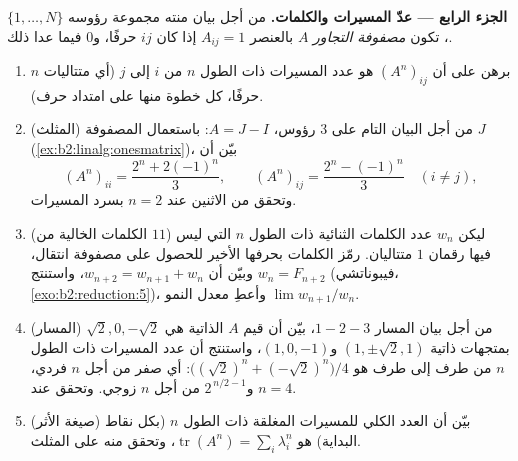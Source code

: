 \begin{problem}
\medskip
\noindent\textbf{الجزء الرابع --- عدّ المسيرات والكلمات.} من أجل
بيان منته مجموعة رؤوسه $\{1, \dots, N\}$، تكون
\emph{مصفوفة التجاور} $A$ بالعنصر $A_{ij} = 1$ إذا كان $ij$ حرفًا،
و$0$ فيما عدا ذلك.
\begin{enumerate}[resume]
  \item برهن على أن $(A^n)_{ij}$ هو عدد المسيرات ذات الطول
        $n$ من $i$ إلى $j$ (أي متتاليات $n$ حرفًا، كل خطوة منها
        على امتداد حرف).
  \item (المثلث) من أجل البيان التام على $3$ رؤوس،
        $A = J - I$: باستعمال  المصفوفة $J$
        (\cref{ex:b2:linalg:onesmatrix})، بيّن أن
        \[
        (A^n)_{ii} = \frac{2^n + 2(-1)^n}{3},
        \qquad
        (A^n)_{ij} = \frac{2^n - (-1)^n}{3} \quad (i \neq j),
        \]
        وتحقق من الاثنين عند $n = 2$ بسرد المسيرات.
  \item (الكلمات الخالية من $11$) ليكن $w_n$ عدد الكلمات
        الثنائية ذات الطول $n$ التي ليس فيها رقمان $1$ متتاليان.
        رمّز الكلمات بحرفها الأخير للحصول على مصفوفة
        انتقال، وبيّن أن $w_{n+2} = w_{n+1} + w_n$، واستنتج $w_n =
        F_{n+2}$ (فيبوناتشي، \cref{exo:b2:reduction:5})، وأعطِ
        معدل النمو $\lim w_{n+1}/w_n$.
  \item (المسار) من أجل بيان المسار $1 - 2 - 3$، بيّن أن
        قيم $A$ الذاتية هي $\sqrt2, 0, -\sqrt2$ بمتجهات
        ذاتية $(1, \pm\sqrt2, 1)$ و$(1, 0, -1)$، واستنتج
        أن عدد المسيرات ذات الطول $n$ من طرف إلى
        طرف هو $\bigl((\sqrt2)^n + (-\sqrt2)^n\bigr)/4$:
        أي صفر من أجل $n$ فردي، و$2^{\,n/2 - 1}$ من أجل $n$ زوجي.
        وتحقق عند $n = 4$.
  \item (صيغة الأثر) بيّن أن العدد الكلي للمسيرات
        المغلقة ذات الطول $n$ (بكل نقاط البداية) هو
        $\operatorname{tr}(A^n) = \sum_i \lambda_i^n$،
        وتحقق منه على المثلث.
\end{enumerate}


\end{problem}
